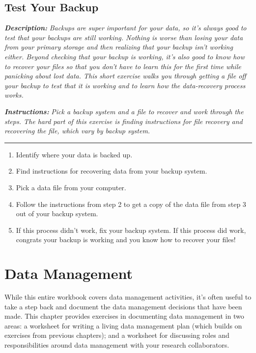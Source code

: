 \documentclass[
]{book}
\providecommand{\tightlist}{%
  \setlength{\itemsep}{0pt}\setlength{\parskip}{0pt}}
\begin{document}
\hypertarget{backup}{%
\section{Test Your Backup}\label{backup}}

\textbf{\emph{Description:}} \emph{Backups are super important for your data, so it's always good to test that your backups are still working. Nothing is worse than losing your data from your primary storage and then realizing that your backup isn't working either. Beyond checking that your backup is working, it's also good to know how to recover your files so that you don't have to learn this for the first time while panicking about lost data. This short exercise walks you through getting a file off your backup to test that it is working and to learn how the data-recovery process works.}

\textbf{\emph{Instructions:}} \emph{Pick a backup system and a file to recover and work through the steps. The hard part of this exercise is finding instructions for file recovery and recovering the file, which vary by backup system.}

\begin{center}\rule{0.5\linewidth}{0.5pt}\end{center}

\begin{enumerate}
\def\labelenumi{\arabic{enumi}.}
\tightlist
\item
  Identify where your data is backed up.
\item
  Find instructions for recovering data from your backup system.
\item
  Pick a data file from your computer.
\item
  Follow the instructions from step 2 to get a copy of the data file from step 3 out of your backup system.
\item
  If this process didn't work, fix your backup system. If this process did work, congrats your backup is working and you know how to recover your files!
\end{enumerate}

\hypertarget{data-management}{%
\chapter{Data Management}\label{data-management}}

While this entire workbook covers data management activities, it's often useful to take a step back and document the data management decisions that have been made. This chapter provides exercises in documenting data management in two areas: a worksheet for writing a living data management plan (which builds on exercises from previous chapters); and a worksheet for discussing roles and responsibilities around data management with your research collaborators.
\end{document}
